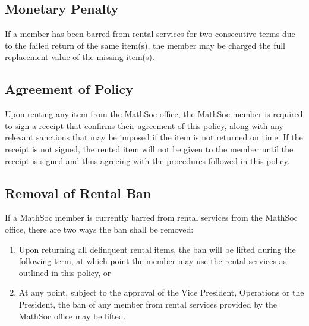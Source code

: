 \subsection{Monetary Penalty}

If a member has been barred from rental services for two consecutive terms due to the failed return of the same item(s), the member may be charged the full replacement value of the missing item(s).

\subsection{Agreement of Policy}

Upon renting any item from the MathSoc office, the MathSoc member is required to sign a receipt that confirms their agreement of this policy, along with any relevant sanctions that may be imposed if the item is not returned on time. If the receipt is not signed, the rented item will not be given to the member until the receipt is signed and thus agreeing with the procedures followed in this policy.

\subsection{Removal of Rental Ban}

If a MathSoc member is currently barred from rental services from the MathSoc office, there are two ways the ban shall be removed:
\begin{enumerate}
    \item Upon returning all delinquent rental items, the ban will be lifted during the following term, at which point the member may use the rental services as outlined in this policy, or
    \item At any point, subject to the approval of the Vice President, Operations or the President, the ban of any member from rental services provided by the MathSoc office may be lifted.
\end{enumerate}
